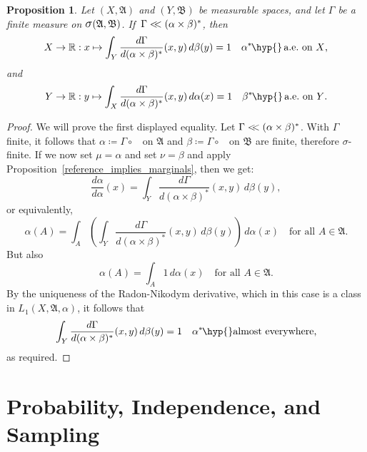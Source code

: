 \documentclass[
twoside=true,
paper=letter,
fontsize=9pt,
pagesize=auto,
leqno,
openany,
headsepline,
overfullrule,
]{scrbook}
\theoremstyle{plain}
\theoremstyle{plain}
\newtheorem{prop}[thm]{Proposition}
\theoremstyle{definition}
\theoremstyle{bfnoteitalic}
\theoremstyle{bfnoteroman}
\newcommand{\sigalg}[1]{\mathfrak{#1}}
\newcommand{\definedby}{\coloneqq}
\newcommand{\sagb}{\mathop{\hbox{\large{$\sigma$}}}\nolimits}
\newcommand{\textsigma}{\hbox{\large{$\sigma$}}\kern-1pt}
\newcommand{\preimage}[1]{\mathop{#1^{\leftarrow}}}
\newcommand{\R}{\mathbb{R}}
\newcommand{\sigmaalgebra}{\sigalg{A}}
\newcommand{\sigmaalgebraii}{\sigalg{B}}
\newcommand{\productsig}[2]{\sagb(#1,#2)}
\newcommand{\kernast}{\ast\kern-1pt}
\newcommand{\measurespace}{X}
\newcommand{\measurespaceii}{Y}
\newcommand{\mspaceelt}{x}
\newcommand{\mspaceeltii}{y}
\newcommand{\abscont}{\mathrel{< \kern-3.5pt <}}
\newcommand{\measmu}{\mu}
\newcommand{\measnu}{\nu}
\newcommand{\seti}{A}
\newcommand{\projectionone}{\pi_1}
\newcommand{\projectiontwo}{\pi_2}
\newcommand{\measonprod}{\Gamma}%
\newcommand{\marginalone}{\alpha}%
\newcommand{\marginaltwo}{\beta}%
\begin{document}
\begin{prop}\label{almost_a_measure}
Let
$(\measurespace, \sigmaalgebra)$
and
$(\measurespaceii, \sigmaalgebraii)$
be measurable spaces, and let  $\measonprod$ be a finite measure on
$\productsig{\sigmaalgebra}{\sigmaalgebraii}$.
If\, $\measonprod \abscont (\marginalone\times\marginaltwo)^*$, then
\[
\measurespace\to\R
:\mspaceelt\mapsto
\int_\measurespaceii \dfrac{d\measonprod}{d(\marginalone\times\marginaltwo)^*}
(\mspaceelt,\mspaceeltii)
\,d\marginaltwo(\mspaceeltii)
=
1
\quad
\text{$\marginalone^\kernast$\hyp{}\,a.e.\ on $\measurespace$,}
\]
and
\[
\measurespaceii\to\R:\mspaceeltii\mapsto
\int_\measurespace \dfrac{d\measonprod}{d(\marginalone\times\marginaltwo)^*}
(\mspaceelt,\mspaceeltii)
\,d\marginalone(\mspaceelt)
=
1
\quad
\text{$\marginaltwo^\kernast$\hyp{}\,a.e.\ on $\measurespaceii$.}
\]
\end{prop}
\begin{proof}
We will prove the first displayed equality.
Let $\measonprod\abscont(\marginalone\times\marginaltwo)^*$.
With $\measonprod$ finite, it follows that
$\marginalone\definedby
\measonprod \circ \preimage{\projectionone}$
on $\sigmaalgebra$
and
$\marginaltwo\definedby
\measonprod \circ \preimage{\projectiontwo}$
on $\sigmaalgebraii$
are finite, therefore \textsigma\hyp{}finite.
If we now set
$\measmu = \marginalone$
and set
$\measnu=\marginaltwo$ and apply Proposition~\ref{reference_implies_marginals}, then we get:
\[
\frac{d \marginalone}{d\marginalone}(\mspaceelt)
=
\int_{\measurespaceii}
\frac{d\measonprod}{d(\marginalone\times\marginaltwo)^*}
(\mspaceelt,\mspaceeltii)
\,d\marginaltwo(\mspaceeltii),
\]
or equivalently,
\[
\marginalone(\seti)
=
\int_\seti
\left(
\int_{\measurespaceii}
\frac{d\measonprod}{d(\marginalone\times\marginaltwo)^*}
(\mspaceelt,\mspaceeltii)
\,d\marginaltwo(\mspaceeltii)
\right)
\,d\marginalone(\mspaceelt)\quad\text{for all $\seti\in\sigmaalgebra$.}
\]
But also
\[
\marginalone(\seti)
=
\int_\seti
1
\,d\marginalone(\mspaceelt)\quad\text{for all $\seti\in\sigmaalgebra$.}
\]
By the uniqueness of the Radon-Nikodym derivative, which in this case is a class in
$L_1(\measurespace, \sigmaalgebra,\marginalone)$, it follows that
\[
\int_{\measurespaceii}
\frac{d\measonprod}{d(\marginalone\times\marginaltwo)^*}
(\mspaceelt,\mspaceeltii)
\,d\marginaltwo(\mspaceeltii)
= 1
\quad
\text{$\marginalone^\kernast$\hyp{}almost everywhere,}
\]
as required.
\end{proof}


\chapter{Probability, Independence, and Sampling}
\end{document}
